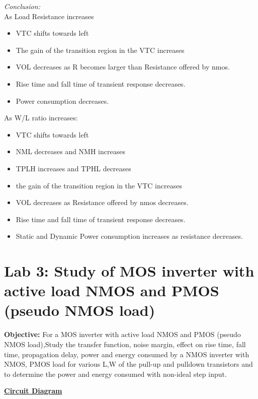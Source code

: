 \documentclass[12pt,a4paper]{article}
\begin{document}
\begin{center}
\clearpage
\textit{Conclusion:} 
\\
As Load Resistance increases
\begin{itemize}
\item VTC shifts towards left 
\item The gain of the transition region in the VTC increases 
\item VOL decreases as R becomes larger than Resistance offered by nmos. 
\item Rise time and fall time of transient response decreases. 
\item Power consumption decreases.
\end{itemize}  
As W/L ratio increases: 
\begin{itemize}
\item VTC shifts towards left 
\item NML decreases and NMH increases 
\item TPLH increases and TPHL decreases 
\item the gain of the transition region in the VTC increases 
\item VOL decreases as Resistance offered by nmos decreases. 
\item Rise time and fall time of transient response decreases. 
\item Static and Dynamic Power consumption increases as resistance decreases.  
\end{itemize}

\clearpage


\section{Lab 3: Study of MOS inverter with active load NMOS and PMOS (pseudo NMOS load)}
\bigskip
{\bf{Objective:}}
For a MOS inverter with active load NMOS and PMOS (pseudo NMOS load),Study the transfer function, noise margin, effect on rise time, fall time, propagation delay,
power and energy consumed by a NMOS inverter with NMOS, PMOS load for various L,W of the pull-up and pulldown transistors and to determine the power and
energy consumed with non-ideal step input.

\underline{\bf{Circuit Diagram}}\\
\vspace{2pt}


\end{center}
\end{document}
